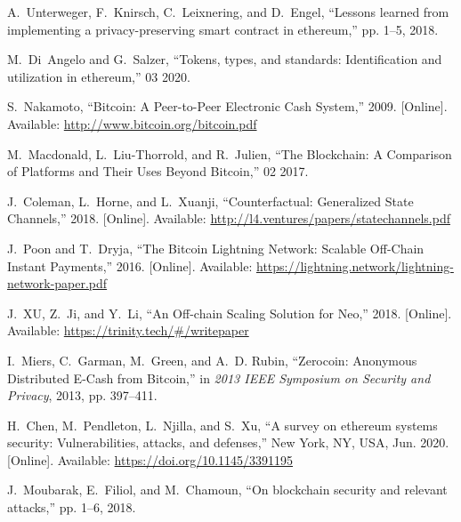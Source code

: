 \documentclass[conference]{IEEEtran}
\begin{document}
\begin{thebibliography}{10}
A.~{Unterweger}, F.~{Knirsch}, C.~{Leixnering}, and D.~{Engel}, ``Lessons
  learned from implementing a privacy-preserving smart contract in ethereum,''
  pp. 1--5, 2018.

M.~Di~Angelo and G.~Salzer, ``Tokens, types, and standards: Identification and
  utilization in ethereum,'' 03 2020.

\BIBentryALTinterwordspacing
S.~Nakamoto, ``{Bitcoin: A Peer-to-Peer Electronic Cash System},'' 2009.
  [Online]. Available: \url{http://www.bitcoin.org/bitcoin.pdf}
\BIBentrySTDinterwordspacing

M.~Macdonald, L.~Liu-Thorrold, and R.~Julien, ``{The Blockchain: A Comparison
  of Platforms and Their Uses Beyond Bitcoin},'' 02 2017.

\BIBentryALTinterwordspacing
J.~Coleman, L.~Horne, and L.~Xuanji, ``{Counterfactual: Generalized State
  Channels},'' 2018. [Online]. Available:
  \url{http://l4.ventures/papers/statechannels.pdf}
\BIBentrySTDinterwordspacing

\BIBentryALTinterwordspacing
J.~Poon and T.~Dryja, ``{The Bitcoin Lightning Network: Scalable Off-Chain
  Instant Payments},'' 2016. [Online]. Available:
  \url{https://lightning.network/lightning-network-paper.pdf}
\BIBentrySTDinterwordspacing

\BIBentryALTinterwordspacing
J.~XU, Z.~Ji, and Y.~Li, ``{An Off-chain Scaling Solution for Neo},'' 2018.
  [Online]. Available: \url{https://trinity.tech/#/writepaper}
\BIBentrySTDinterwordspacing

I.~Miers, C.~Garman, M.~Green, and A.~D. Rubin, ``{Zerocoin: Anonymous
  Distributed E-Cash from Bitcoin},'' in \emph{2013 IEEE Symposium on Security
  and Privacy}, 2013, pp. 397--411.

\BIBentryALTinterwordspacing
H.~Chen, M.~Pendleton, L.~Njilla, and S.~Xu, ``A survey on ethereum systems
  security: Vulnerabilities, attacks, and defenses,'' New York, NY, USA, Jun.
  2020. [Online]. Available: \url{https://doi.org/10.1145/3391195}
\BIBentrySTDinterwordspacing

J.~{Moubarak}, E.~{Filiol}, and M.~{Chamoun}, ``On blockchain security and
  relevant attacks,'' pp. 1--6, 2018.

\end{thebibliography}
\end{document}

